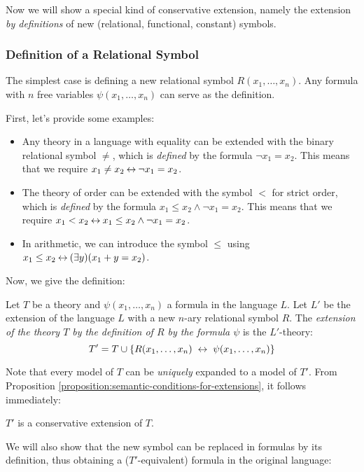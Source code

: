 Now we will show a special kind of conservative extension, namely the extension \emph{by definitions} of new (relational, functional, constant) symbols.

\subsubsection*{Definition of a Relational Symbol}

The simplest case is defining a new relational symbol $R(x_1,\dots,x_n)$. Any formula with $n$ free variables $\psi(x_1,\dots,x_n)$ can serve as the definition.

\begin{example}
First, let's provide some examples:
\begin{itemize}
    \item Any theory in a language with equality can be extended with the binary relational symbol $\neq$, which is \emph{defined} by the formula $\neg x_1=x_2$. This means that we require $x_1\neq x_2\mathbin{\leftrightarrow}\neg x_1=x_2$.
    \item The theory of order can be extended with the symbol $<$ for strict order, which is \emph{defined} by the formula $x_1\leq x_2\land \neg x_1=x_2$. This means that we require $x_1<x_2 \mathbin{\leftrightarrow} x_1\leq x_2\land \neg x_1=x_2$.
    \item In arithmetic, we can introduce the symbol $\leq$ using $x_1\leq x_2\mathbin{\leftrightarrow}(\exists y)(x_1+y=x_2)$.
\end{itemize}
\end{example}
Now, we give the definition:
\begin{definition}
    Let $T$ be a theory and $\psi(x_1,\dots,x_n)$ a formula in the language $L$. Let $L'$ be the extension of the language $L$ with a new $n$-ary relational symbol $R$. The \emph{extension of the theory $T$ by the definition of $R$ by the formula $\psi$} is the $L'$-theory:
    $$
    T'=T\cup\{R(x_1,\dots,x_n)\ \liff\ \psi(x_1,\dots,x_n)\}
    $$
\end{definition}
Note that every model of $T$ can be \emph{uniquely} expanded to a model of $T'$. From Proposition \ref{proposition:semantic-conditions-for-extensions}, it follows immediately:
\begin{corollary}
    $T'$ is a conservative extension of $T$.
\end{corollary}

We will also show that the new symbol can be replaced in formulas by its definition, thus obtaining a ($T'$-equivalent) formula in the original language:

